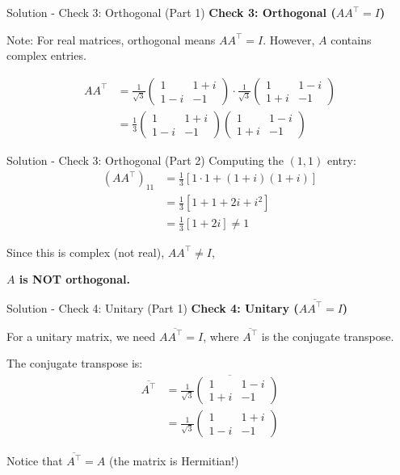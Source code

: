 \documentclass{beamer}
\newcommand{\myvec}[1]{\ensuremath{\begin{pmatrix}#1\end{pmatrix}}}
\begin{document}
	\begin{frame}{Solution - Check 3: Orthogonal (Part 1)}
		\textbf{Check 3: Orthogonal ($AA^\top = I$)}
		
		Note: For real matrices, orthogonal means $AA^\top = I$. However, $A$ contains complex entries.
		
		\begin{align}
			AA^\top &= \frac{1}{\sqrt{3}}\myvec{1 & 1+i \\ 1-i & -1} \cdot \frac{1}{\sqrt{3}}\myvec{1 & 1-i \\ 1+i & -1}\\
			&= \frac{1}{3}\myvec{1 & 1+i \\ 1-i & -1}\myvec{1 & 1-i \\ 1+i & -1}
		\end{align}
	\end{frame}
	
	\begin{frame}{Solution - Check 3: Orthogonal (Part 2)}
		Computing the $(1,1)$ entry:
		\begin{align}
			(AA^\top)_{11} &= \frac{1}{3}\left[1 \cdot 1 + (1+i)(1+i)\right]\\
			&= \frac{1}{3}\left[1 + 1 + 2i + i^2\right]\\
			&= \frac{1}{3}[1 + 2i] \neq 1
		\end{align}
		
		Since this is complex (not real), $AA^\top \neq I$,
		
		\vspace{0.5em}
		\textbf{$A$ is NOT orthogonal.}
	\end{frame}
	
	\begin{frame}{Solution - Check 4: Unitary (Part 1)}
		\textbf{Check 4: Unitary ($A\overline{A^\top} = I$)}
		
		For a unitary matrix, we need $A\overline{A^\top} = I$, where $\overline{A^\top}$ is the conjugate transpose.
		
		The conjugate transpose is:
		\begin{align}
			\overline{A^\top} &= \overline{\frac{1}{\sqrt{3}}\myvec{1 & 1-i \\ 1+i & -1}}\\
			&= \frac{1}{\sqrt{3}}\myvec{1 & 1+i \\ 1-i & -1}
		\end{align}
		
		Notice that $\overline{A^\top} = A$ (the matrix is Hermitian!)
	\end{frame}
	
\end{document}
